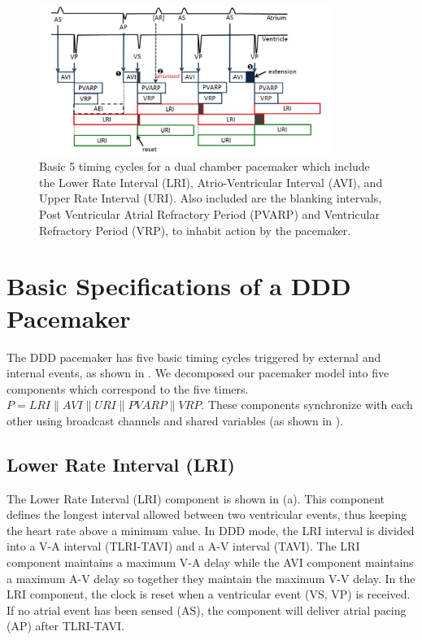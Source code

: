 \begin{figure}[!b]
\center
\includegraphics[width=0.85\textwidth]{figs/PM_timers.pdf}
\caption{Basic 5 timing cycles for a dual chamber pacemaker which include the Lower Rate Interval (LRI),  Atrio-Ventricular Interval (AVI), and Upper Rate Interval (URI). Also included are the blanking intervals, Post Ventricular Atrial Refractory Period (PVARP) and Ventricular Refractory Period (VRP), to inhabit action by the pacemaker.}
\label{fig:PMtimers}

\end{figure} 
\section{Basic Specifications of a DDD Pacemaker}
The DDD pacemaker has five basic timing cycles triggered by external and internal events, as shown in . We decomposed our pacemaker model into five components which correspond to the five timers. $P=LRI\| AVI\| URI\| PVARP\| VRP$. These components synchronize with each other using broadcast channels and shared variables (as shown in ). 

\subsection{Lower Rate Interval (LRI)}
The Lower Rate Interval (LRI) component is shown in (a). This component defines the longest interval allowed between two ventricular events, thus keeping the heart rate above a minimum value. In DDD mode, the LRI interval is divided into a V-A interval (TLRI-TAVI) and a A-V interval (TAVI). The LRI component maintains a maximum V-A delay while the AVI component maintains a maximum A-V delay so together they maintain the maximum V-V delay. In the LRI component, the clock is reset when a ventricular event \textsf{(VS, VP)} is received. If no atrial event has been sensed \textsf{(AS)}, the component will deliver atrial pacing \textsf{(AP)} after TLRI-TAVI. 

